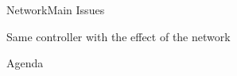 \begin{frame}{Network}{Main Issues}
\begin{minipage}{\linewidth}
\begin{minipage}{0.49\linewidth}
\begin{figure}[H]
            \end{figure}  
            \centering
            Same controller with the effect of the network                   
        \end{minipage}
    \end{minipage}  
\end{frame}

\begin{frame}{Agenda}{}
    \tableofcontents
\end{frame}

